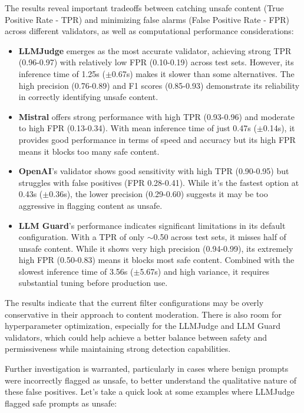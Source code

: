 The results reveal important tradeoffs between catching unsafe content (True Positive Rate - TPR) and minimizing false alarms (False Positive Rate - FPR) across different validators, as well as computational performance considerations:

\begin{itemize}
\item \textbf{LLMJudge} emerges as the most accurate validator, achieving strong TPR (0.96-0.97) with relatively low FPR (0.10-0.19) across test sets. However, its inference time of 1.25s ($\pm$0.67s) makes it slower than some alternatives. The high precision (0.76-0.89) and F1 scores (0.85-0.93) demonstrate its reliability in correctly identifying unsafe content.
  
\item \textbf{Mistral} offers strong performance with high TPR (0.93-0.96) and moderate to high FPR (0.13-0.34). With mean inference time of just 0.47s ($\pm$0.14s), it provides good performance in terms of speed and accuracy but its high FPR means it blocks too many safe content.
  
\item \textbf{OpenAI}'s validator shows good sensitivity with high TPR (0.90-0.95) but struggles with false positives (FPR 0.28-0.41). While it's the fastest option at 0.43s ($\pm$0.36s), the lower precision (0.29-0.60) suggests it may be too aggressive in flagging content as unsafe.
  
\item \textbf{LLM Guard}'s performance indicates significant limitations in its default configuration. With a TPR of only $\sim$0.50 across test sets, it misses half of unsafe content. While it shows very high precision (0.94-0.99), its extremely high FPR (0.50-0.83) means it blocks most safe content. Combined with the slowest inference time of 3.56s ($\pm$5.67s) and high variance, it requires substantial tuning before production use.
\end{itemize}

The results indicate that the current filter configurations may be overly conservative in their approach to content moderation. There is also room for hyperparameter optimization, especially for the LLMJudge and LLM Guard validators, which could help achieve a better balance between safety and permissiveness while maintaining strong detection capabilities.

Further investigation is warranted, particularly in cases where benign prompts were incorrectly flagged as unsafe, to better understand the qualitative nature of these false positives. Let's take a quick look at some examples where LLMJudge flagged safe prompts as unsafe:

